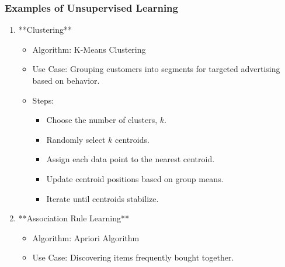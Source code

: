 \documentclass[aspectratio=169]{beamer}
\begin{document}
\begin{frame}[fragile]
  \frametitle{Examples of Unsupervised Learning}
  
  \begin{enumerate}
    \item **Clustering**
      \begin{itemize}
        \item Algorithm: K-Means Clustering
        \item Use Case: Grouping customers into segments for targeted advertising based on behavior.
      \end{itemize}
      \begin{itemize}
        \item Steps:
          \begin{itemize}
            \item Choose the number of clusters, $k$.
            \item Randomly select $k$ centroids.
            \item Assign each data point to the nearest centroid.
            \item Update centroid positions based on group means.
            \item Iterate until centroids stabilize.
          \end{itemize}
      \end{itemize}

    \item **Association Rule Learning**
      \begin{itemize}
        \item Algorithm: Apriori Algorithm
        \item Use Case: Discovering items frequently bought together.
      \end{itemize}
  \end{enumerate}
  
\end{frame}
\end{document}
